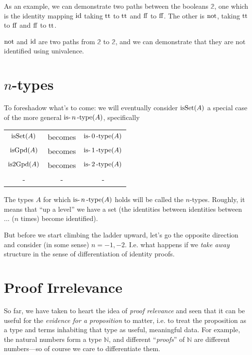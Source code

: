 \documentclass[11pt]{article}
\begin{document}
As an example, we can demonstrate two paths between the booleans
$\mathbb{2}$, one which is the identity mapping $\operatorname{id}$ taking $\operatorname{tt}$
to $\operatorname{tt}$ and $\operatorname{ff}$ to $\operatorname{ff}$. The other is $\operatorname{not}$, taking
$\operatorname{tt}$ to $\operatorname{ff}$ and $\operatorname{ff}$ to $\operatorname{tt}$.

$\operatorname{not}$ and $\operatorname{id}$ are two paths from $\mathbb{2}$ to $\mathbb{2}$,
and we can demonstrate that they are not identified using univalence.


\section{$n$-types}

To foreshadow what's to come: we will eventually consider $\operatorname{isSet}(A)$ a
special case of the more general $\operatorname{is-}n\operatorname{-type}(A)$, specifically

\newcommand{\isntype}[1]{\op{is-}{#1}\op{-type}}

\begin{tabular}{ccc}
$\operatorname{isSet}(A)$ & becomes & $\isntype{0}(A)$ \\
$\operatorname{isGpd}(A)$ & becomes & $\isntype{1}(A)$ \\
$\operatorname{is2Gpd}(A)$ & becomes & $\isntype{2}(A)$ \\
- & - & -
\end{tabular}

The types $A$ for which $\operatorname{is-}n\operatorname{-type}(A)$ holds will be called the
$n$-types. Roughly, it means that ``up a level'' we have a set (the
identities between identities between ... ($n$ times) become identified).

But before we start climbing the ladder upward, let's go the opposite
direction and consider (in some sense) $n=-1, -2$. I.e. what happens if we
{\em take away} structure in the sense of differentiation of identity
proofs.

\section{Proof Irrelevance}

So far, we have taken to heart the idea of {\em proof relevance} and seen
that it can be useful for the {\em evidence for a proposition} to matter,
i.e. to treat the proposition as a type and terms inhabiting that type as
useful, meaningful data. For example, the natural numbers form a type
$\mathbb{N}$, and different ``{\em proofs}'' of $\mathbb{N}$ are different
numbers---so of course we care to differentiate them.
\end{document}

